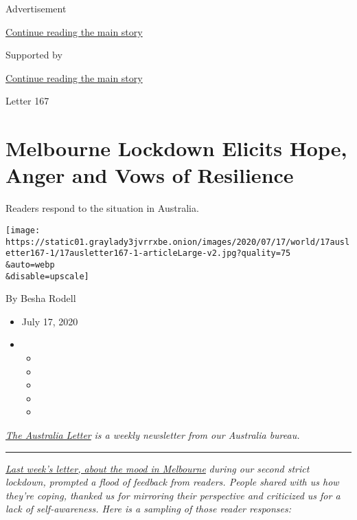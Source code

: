 Advertisement

\protect\hyperlink{after-top}{Continue reading the main story}

Supported by

\protect\hyperlink{after-sponsor}{Continue reading the main story}

Letter 167

\hypertarget{melbourne-lockdown-elicits-hope-anger-and-vows-of-resilience}{%
\section{Melbourne Lockdown Elicits Hope, Anger and Vows of
Resilience}\label{melbourne-lockdown-elicits-hope-anger-and-vows-of-resilience}}

Readers respond to the situation in Australia.

\texttt{[image: https://static01.graylady3jvrrxbe.onion/images/2020/07/17/world/17ausletter167-1/17ausletter167-1-articleLarge-v2.jpg?quality=75\\\&auto=webp\\\&disable=upscale]}

By Besha Rodell

\begin{itemize}
\item
  July 17, 2020
\item
  \begin{itemize}
  \item
  \item
  \item
  \item
  \item
  \end{itemize}
\end{itemize}

\href{https://www.nytimes3xbfgragh.onion/series/nyt-australia-newsletter?module=inline}{\emph{The
Australia Letter}} \emph{is a weekly newsletter from our Australia
bureau.}

\begin{center}\rule{0.5\linewidth}{\linethickness}\end{center}

\href{https://www.nytimes3xbfgragh.onion/2020/07/10/world/australia/melbourne-lockdown.html}{\emph{Last
week's letter, about the mood in Melbourne}} \emph{during our second
strict lockdown, prompted a flood of feedback from readers. People
shared with us how they're coping, thanked us for mirroring their
perspective and criticized us for a lack of self-awareness. Here is a
sampling of those reader responses:}

